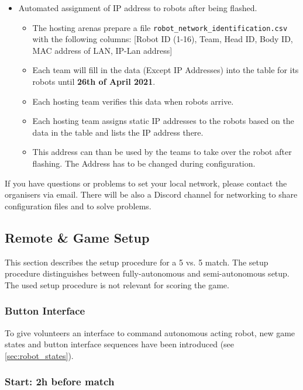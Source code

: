 \begin{itemize}
\begin{itemize}
    \end{itemize}
    \item Automated assignment of IP address to robots after being flashed.
    \begin{itemize}
        \item \label{sec:robot_table} The hosting arenas prepare a file \texttt{robot\_network\_identification.csv} with the following columns: [Robot ID (1-16), Team, Head ID, Body ID, MAC address of LAN, IP-Lan address] 
        \item Each team will fill in the data (Except IP Addresses) into the table for its robots until \textbf{26th of April 2021}.
        \item Each hosting team verifies this data when robots arrive.
        \item Each hosting team assigns static IP addresses to the robots based on the data in the table and lists the IP address there.
        \item This address can than be used by the teams to take over the robot after flashing. The Address has to be changed during configuration.
    \end{itemize}
\end{itemize}

If you have questions or problems to set your local network, please contact the organisers via email. There will be also a Discord channel for networking to share configuration files and to solve problems.

\subsection{Remote \& Game Setup}
\label{sec:remote_game_setup}
This section describes the setup procedure for a 5 vs. 5 match. The setup procedure distinguishes between fully-autonomous and semi-autonomous setup. The used setup procedure is not relevant for scoring the game.

\subsubsection{Button Interface}
To give volunteers an interface to command autonomous acting robot, new game states and button interface sequences have been introduced (see \ref{sec:robot_states}).

\subsubsection{Start: 2h before match}
\label{sec:setup_two_hours}

